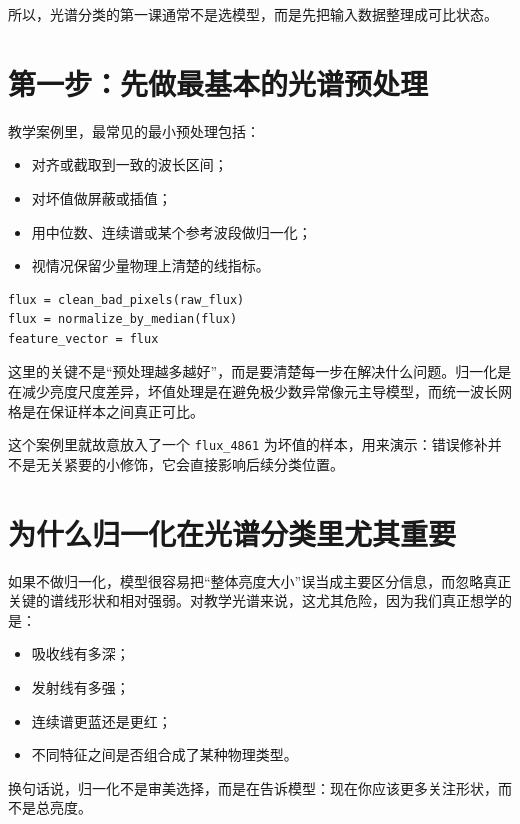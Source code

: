 所以，光谱分类的第一课通常不是选模型，而是先把输入数据整理成可比状态。

\section{第一步：先做最基本的光谱预处理}

教学案例里，最常见的最小预处理包括：

\begin{itemize}
    \item 对齐或截取到一致的波长区间；
    \item 对坏值做屏蔽或插值；
    \item 用中位数、连续谱或某个参考波段做归一化；
    \item 视情况保留少量物理上清楚的线指标。
\end{itemize}

\begin{examplebox}[一个最小预处理思路]
\begin{lstlisting}[style=pythonstyle]
flux = clean_bad_pixels(raw_flux)
flux = normalize_by_median(flux)
feature_vector = flux
\end{lstlisting}
\end{examplebox}

这里的关键不是“预处理越多越好”，而是要清楚每一步在解决什么问题。归一化是在减少亮度尺度差异，坏值处理是在避免极少数异常像元主导模型，而统一波长网格是在保证样本之间真正可比。

这个案例里就故意放入了一个 \texttt{flux\_4861} 为坏值的样本，用来演示：错误修补并不是无关紧要的小修饰，它会直接影响后续分类位置。

\section{为什么归一化在光谱分类里尤其重要}

如果不做归一化，模型很容易把“整体亮度大小”误当成主要区分信息，而忽略真正关键的谱线形状和相对强弱。对教学光谱来说，这尤其危险，因为我们真正想学的是：

\begin{itemize}
    \item 吸收线有多深；
    \item 发射线有多强；
    \item 连续谱更蓝还是更红；
    \item 不同特征之间是否组合成了某种物理类型。
\end{itemize}

换句话说，归一化不是审美选择，而是在告诉模型：现在你应该更多关注形状，而不是总亮度。

